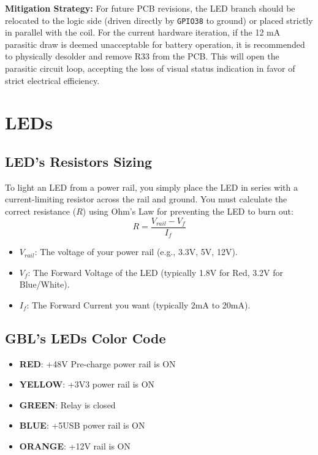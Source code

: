 \documentclass[11pt,a4paper]{article}
\begin{document}
\textbf{Mitigation Strategy:} For future PCB revisions, the LED branch should be relocated to the logic side (driven directly by \texttt{GPIO38} to ground) or placed strictly in parallel with the coil. For the current hardware iteration, if the 12 mA parasitic draw is deemed unacceptable for battery operation, it is recommended to physically desolder and remove R33 from the PCB. This will open the parasitic circuit loop, accepting the loss of visual status indication in favor of strict electrical efficiency.

\section{LEDs}
\subsection{LED's Resistors Sizing}
To light an LED from a power rail, you simply place the LED in series with a current-limiting resistor across the rail and ground. You must calculate the correct resistance ($R$) using Ohm's Law for preventing the LED to burn out:
\begin{equation}
    R = \frac{V_{rail} - V_{f}}{I_{f}}
\end{equation}
\begin{itemize}
    \item $V_{rail}$: The voltage of your power rail (e.g., 3.3V, 5V, 12V).
    \item $V_{f}$: The Forward Voltage of the LED (typically 1.8V for Red, 3.2V for Blue/White).
    \item $I_{f}$: The Forward Current you want (typically 2mA to 20mA).
\end{itemize}

\subsection{GBL's LEDs Color Code}
\begin{itemize}
    \item \textbf{RED}: +48V Pre-charge power rail is ON
    \item \textbf{YELLOW}: +3V3 power rail is ON
    \item \textbf{GREEN}: Relay is closed
    \item \textbf{BLUE}: +5USB power rail is ON
    \item \textbf{ORANGE}: +12V rail is ON
\end{itemize}
\end{document}
